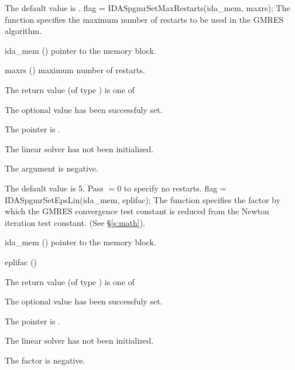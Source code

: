 {
  The default value is .
}
{
  flag = IDASpgmrSetMaxRestarts(ida\_mem, maxrs);
}
{
  The function  specifies the maximum number of 
  restarts to be used in the GMRES algorithm.
}
{
  \begin{args}
  \item[ida\_mem] ()
    pointer to the {\ida} memory block.
  \item[maxrs] ()
    maximum number of restarts.
  \end{args}
}
{
  The return value  (of type ) is one of
  \begin{args}
  \item[\Id{IDASPGMR\_SUCCESS}] 
    The optional value has been successfuly set.
  \item[\Id{IDASPGMR\_MEM\_NULL}]
    The  pointer is .
  \item[\Id{IDASPGMR\_LMEM\_NULL}]
    The {\idaspgmr} linear solver has not been initialized.
  \item[\Id{IDASPGMR\_ILL\_INPUT}]
    The  argument is negative.
  \end{args}
}
{
  The default value is $5$. Pass  $=0$ to specify no restarts.
}
{
  flag = IDASpgmrSetEpsLin(ida\_mem, eplifac);
}
{
  The function  specifies the factor by
  which the GMRES convergence test constant is reduced
  from the Newton iteration test constant. (See \S\ref{s:math}).
}
{
  \begin{args}
  \item[ida\_mem] ()
    pointer to the {\ida} memory block.
  \item[eplifac] ()

  \end{args}
}
{
  The return value  (of type ) is one of
  \begin{args}
  \item[\Id{IDASPGMR\_SUCCESS}] 
    The optional value has been successfuly set.
  \item[\Id{IDASPGMR\_MEM\_NULL}]
    The  pointer is .
  \item[\Id{IDASPGMR\_LMEM\_NULL}]
    The {\idaspgmr} linear solver has not been initialized.
  \item[\Id{IDASPGMR\_ILL\_INPUT}]
    The factor  is negative.  
  \end{args}
}
